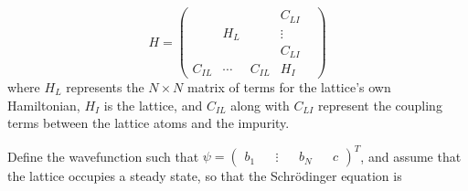 \documentclass[aps,pra,superscriptaddress,twocolumn]{revtex4-1}
\newcommand{\commentSB}[1]{\texttt{\color{blue}[#1]}}
\begin{document}
\begin{equation}
    H = \begin{pmatrix}
        ~ & ~ & ~ &   C_{LI} \\ 
        ~ & H_L & ~ & \vdots \\
        ~ & ~ & ~ & C_{LI} & \\
        C_{IL} & \cdots & C_{IL} & H_I   
    \end{pmatrix}
    \label{eqn:blockH1}
\end{equation}
where $H_L$ represents the $N \times N$ matrix of terms for the lattice's own Hamiltonian, $H_I$ is the lattice, and $C_{IL}$ along with $C_{LI}$ represent the coupling terms between the lattice atoms and the impurity. 

Define the wavefunction such that
$ \psi = 
\begin{pmatrix}
    b_1 && \vdots && b_N && c
\end{pmatrix}^T 
\label{eqn:psi} $,
and assume that the lattice occupies a steady state, so that the Schr\"odinger equation is
\end{document}
